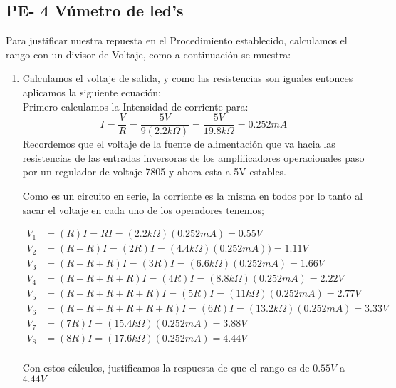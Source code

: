 \documentclass[12pt]{article}
\begin{document}
		\subsection{PE- 4 Vúmetro de led's}
		
		Para justificar nuestra repuesta en el Procedimiento establecido, calculamos el rango con un divisor de Voltaje, como a continuación se muestra:
		
		\begin{enumerate}
		    \item Calculamos el voltaje de salida, y como las resistencias son iguales entonces aplicamos la siguiente ecuación:\\
		    Primero calculamos la Intensidad de corriente para:
		     $$
		        I = \frac{V}{R} = \frac{5V}{9(2.2k\Omega)} = \frac{5V}{19.8k\Omega} = 0.252 mA 
		     $$
		     Recordemos que el voltaje de la fuente de alimentación que va hacia las resistencias de las entradas inversoras de los amplificadores operacionales paso por un regulador de voltaje 7805 y ahora esta a 5V estables.
		     
		     Como es un circuito en serie, la corriente es la misma en todos por lo tanto al sacar el voltaje en cada uno de los operadores tenemos;
		   
		    \begin{equation*}
		        \begin{split}

		             V_{1} &= (R)I = RI = (2.2k\Omega)(0.252mA) = 0.55 V   \\
		            V_{2} &= (R+R)I = (2R)I = (4.4k\Omega)(0.252mA)) = 1.11 V     \\
		            V_{3} &= (R+R+R)I = (3R)I = (6.6k\Omega)(0.252mA) = 1.66 V     \\
		            V_{4} &= (R+R+R+R)I = (4R)I = (8.8k\Omega)(0.252mA) = 2.22 V     \\
		            V_{5} &= (R+R+R+R+R)I = (5R)I = (11k\Omega)(0.252mA) = 2.77 V     \\
		            V_{6} &= (R+R+R+R+R+R)I = (6R)I = (13.2k\Omega)(0.252mA) = 3.33 V     \\
		            V_{7} &= (7R)I = (15.4k\Omega)(0.252mA) = 3.88 V     \\
		            V_{8} &= (8R)I =  (17.6k\Omega)(0.252mA) = 4.44 V     \\

		        \end{split}
		    \end{equation*}
		    
		    Con estos cálculos, justificamos la respuesta de que el rango es de $0.55 V$ a $4.44 V$
		    
		\end{enumerate}


	\nocite{ref1, ref2, ref3, ref4}
	
\end{document}
